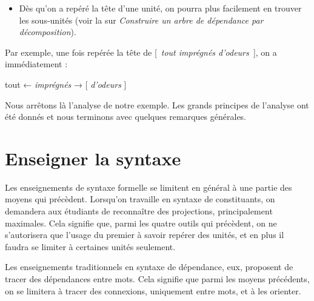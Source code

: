 \begin{itemize}
\item \begin{styleLivreImportant}
Dès qu’on a repéré la tête d’une unité, on pourra plus facilement en trouver les sous-unités (voir la  sur \textit{Construire un arbre de dépendance par décomposition}).
\end{styleLivreImportant}
\end{itemize}

Par exemple, une fois repérée la tête de [~\textit{tout imprégnés d’odeurs~}], on a immédiatement :

\ea
{tout} ← \textit{imprégnés} → [ \textit{d’odeurs} ]
\z

Nous arrêtons là l’analyse de notre exemple. Les grands principes de l’analyse ont été donnés et nous terminons avec quelques remarques générales.

\section{Enseigner la syntaxe}\label{sec:3.4.28}

Les enseignements de syntaxe formelle se limitent en général à une partie des moyens qui précèdent. Lorsqu’on travaille en syntaxe de constituants, on demandera aux étudiants de reconnaître des projections, principalement maximales. Cela signifie que, parmi les quatre outils qui précèdent, on ne s’autorisera que l’usage du premier à savoir repérer des unités, et en plus il faudra se limiter à certaines unités seulement.

Les enseignements traditionnels en syntaxe de dépendance, eux, proposent de tracer des dépendances entre mots. Cela signifie que parmi les moyens précédents, on se limitera à tracer des connexions, uniquement entre mots, et à les orienter.

